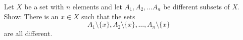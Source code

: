 Let $X$ be a set with $n$ elements and let $A_1, A_2, \ldots A_n$ be different subsets of $X$.
Show: There is an $x \in X$ such that the sets
$$A_1 \setminus \{x\}, A_2 \setminus \{x\}, \ldots , A_n \setminus \{x\}$$
are all different.
